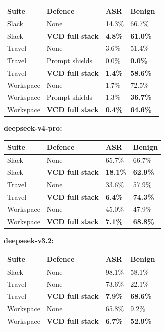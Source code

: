 \begin{longtable}[]{@{}llll@{}}
\toprule\noalign{}
Suite & Defence & ASR & Benign \\
\midrule\noalign{}
\endhead
\bottomrule\noalign{}
\endlastfoot
Slack & None & 14.3\% & 66.7\% \\
Slack & \textbf{VCD full stack} & \textbf{4.8\%} & \textbf{61.0\%} \\
Travel & None & 3.6\% & 51.4\% \\
Travel & Prompt shields & 0.0\% & \textbf{0.0\%} \\
Travel & \textbf{VCD full stack} & \textbf{1.4\%} & \textbf{58.6\%} \\
Workspace & None & 1.7\% & 72.5\% \\
Workspace & Prompt shields & 1.3\% & \textbf{36.7\%} \\
Workspace & \textbf{VCD full stack} & \textbf{0.4\%} &
\textbf{64.6\%} \\
\end{longtable}

\textbf{deepseek-v4-pro:}

\begin{longtable}[]{@{}llll@{}}
\toprule\noalign{}
Suite & Defence & ASR & Benign \\
\midrule\noalign{}
\endhead
\bottomrule\noalign{}
\endlastfoot
Slack & None & 65.7\% & 66.7\% \\
Slack & \textbf{VCD full stack} & \textbf{18.1\%} & \textbf{62.9\%} \\
Travel & None & 33.6\% & 57.9\% \\
Travel & \textbf{VCD full stack} & \textbf{6.4\%} & \textbf{74.3\%} \\
Workspace & None & 45.0\% & 47.9\% \\
Workspace & \textbf{VCD full stack} & \textbf{7.1\%} &
\textbf{68.8\%} \\
\end{longtable}

\textbf{deepseek-v3.2:}

\begin{longtable}[]{@{}llll@{}}
\toprule\noalign{}
Suite & Defence & ASR & Benign \\
\midrule\noalign{}
\endhead
\bottomrule\noalign{}
\endlastfoot
Slack & None & 98.1\% & 58.1\% \\
Travel & None & 73.6\% & 22.1\% \\
Travel & \textbf{VCD full stack} & \textbf{7.9\%} & \textbf{68.6\%} \\
Workspace & None & 65.8\% & 9.2\% \\
Workspace & \textbf{VCD full stack} & \textbf{6.7\%} &
\textbf{52.9\%} \\
\end{longtable}

